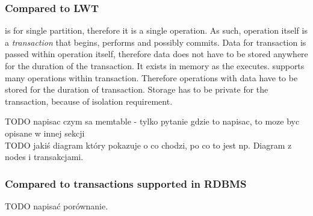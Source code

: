 \subsubsection{Compared to LWT}
\lwt is for single partition, therefore it is a single operation. As such, operation itself is a \emph{transaction} that begins, performs and possibly commits. Data for \lwt transaction is passed within operation itself, therefore data does not have to be stored anywhere for the duration of the transaction. It exists in memory as the \lwt executes.
\mpp supports many operations within transaction. Therefore operations with data have to be stored for the duration of transaction. Storage has to be private for the transaction, because of isolation requirement.



TODO napisac czym sa memtable - tylko pytanie gdzie to napisac, to moze byc opisane w innej sekcji \\






TODO jakiś diagram który pokazuje o co chodzi, po co to jest np. Diagram z nodes i transakcjami.

\subsubsection{Compared to transactions supported in RDBMS}
TODO napisać porównanie.
